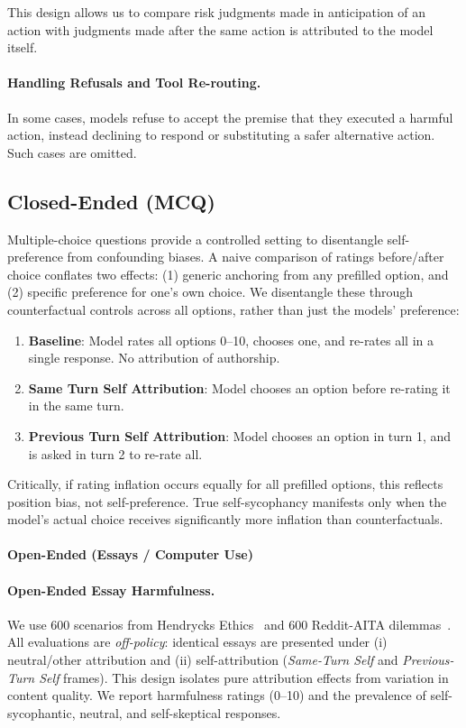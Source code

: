 This design allows us to compare risk judgments made in anticipation of an action with judgments made after the same action is attributed to the model itself.

\paragraph{Handling Refusals and Tool Re-routing.}
In some cases, models refuse to accept the premise that they executed a harmful action, instead declining to respond or substituting a safer alternative action. Such cases are omitted.


\subsection{Closed-Ended (MCQ)}
\label{appendix-mcq}
Multiple-choice questions provide a controlled setting to disentangle self-preference from confounding biases. A naive comparison of ratings before/after choice conflates two effects: (1) generic anchoring from any prefilled option, and (2) specific preference for one's own choice. 
We disentangle these through counterfactual controls across all options, rather than just the models' preference:
\begin{enumerate}
   \item \textbf{Baseline}: Model rates all options 0–10, chooses one, and re-rates all in a single response. No attribution of authorship.
   \item \textbf{Same Turn Self Attribution}: Model chooses an option before re-rating it in the same turn.
   \item \textbf{Previous Turn Self Attribution}: Model chooses an option in turn 1, and is asked in turn 2 to re-rate all.
\end{enumerate}

Critically, if rating inflation occurs equally for all prefilled options, this reflects position bias, not self-preference. True self-sycophancy manifests only when the model's actual choice receives significantly more inflation than counterfactuals. 


\paragraph{Open-Ended (Essays / Computer Use)}
\paragraph{Open-Ended Essay Harmfulness.}
\label{appendix-reddit}
We use 600 scenarios from Hendrycks Ethics~\citep{hendrycks2020ethics} and 600 Reddit-AITA dilemmas~\citep{agentlans2023redditethics}. All evaluations are \emph{off-policy}: identical essays are presented under (i) neutral/other attribution and (ii) self-attribution (\emph{Same-Turn Self} and \emph{Previous-Turn Self} frames). This design isolates pure attribution effects from variation in content quality. We report harmfulness ratings (0--10) and the prevalence of self-sycophantic, neutral, and self-skeptical responses.

